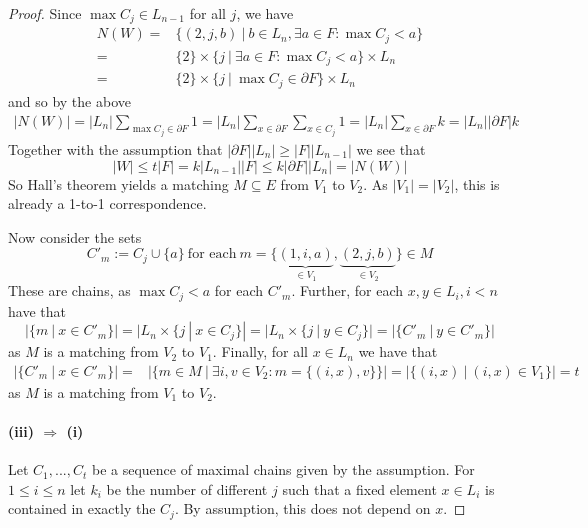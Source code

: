 \documentclass{scrartcl}
\theoremstyle{definition}
\begin{document}
\begin{proof}
    Since $\max C_j \in L_{n - 1}$ for all $j$, we have
    \begin{align*}
        N(W) =& \{ (2, j, b) \ | \ b \in L_n, \exists a \in F: \max C_j < a \} \\
        =& \{2\} \times \{ j \ | \ \exists a \in F: \max C_j < a \} \times L_n \\
        =& \{2\} \times \{ j \ | \ \max C_j \in \partial F \} \times L_n
    \end{align*}
    and so by the above
    \begin{align*}
        |N(W)| = |L_n| \sum_{\max C_j \in \partial F} 1 = |L_n| \sum_{x \in \partial F} \sum_{x \in C_j} 1 = |L_n| \sum_{x \in \partial F} k = |L_n| |\partial F| k
    \end{align*}
    Together with the assumption that $|\partial F| |L_n| \geq |F| |L_{n - 1}|$ we see that
    \begin{equation*}
        |W| \leq t |F| = k |L_{n - 1}| |F| \leq k |\partial F| |L_n| = |N(W)|
    \end{equation*}
    So Hall's theorem yields a matching $M \subseteq E$ from $V_1$ to $V_2$.
    As $|V_1| = |V_2|$, this is already a 1-to-1 correspondence.

    Now consider the sets
    \begin{equation*}
        C'_m := C_j \cup \{ a \} \ \text{for each} \ m = \{\underbrace{(1, i, a)}_{\in V_1}, \underbrace{(2, j, b)}_{\in V_2}\} \in M
    \end{equation*}
    These are chains, as $\max C_j < a$ for each $C'_m$.
    Further, for each $x, y \in L_i, i < n$ have that
    \begin{equation*}
        |\{ m \ | \ x \in C'_m \}| = |L_n \times \{ j \ | \ x \in C_j \}| = |L_n \times \{ j \ | \ y \in C_j \}| = |\{ C'_m \ | \ y \in C'_m \}|
    \end{equation*}
    as $M$ is a matching from $V_2$ to $V_1$.
    Finally, for all $x \in L_n$ we have that
    \begin{align*}
        |\{ C'_m \ | \ x \in C'_m \}| =& |\{ m \in M \ | \ \exists i, v \in V_2: m = \{ (i, x), v \} \}| = |\{ (i, x) \ | \ (i, x) \in V_1 \}| = t
    \end{align*}
    as $M$ is a matching from $V_1$ to $V_2$.

    \paragraph{(iii) $\Rightarrow$ (i)} Let $C_1, ..., C_t$ be a sequence of maximal chains given by the assumption.
    For $1 \leq i \leq n$ let $k_i$ be the number of different $j$ such that a fixed element $x \in L_i$ is contained in exactly the $C_j$.
    By assumption, this does not depend on $x$.


\end{proof}
\end{document}
